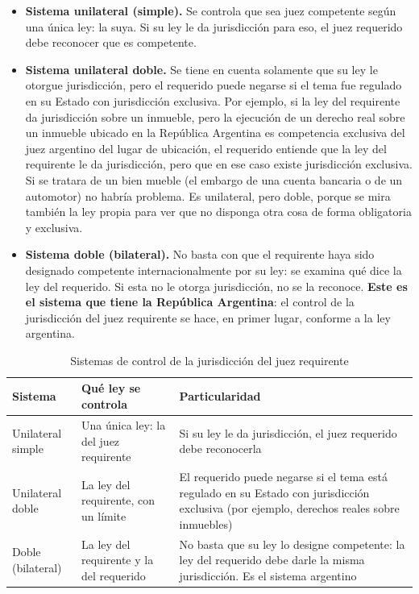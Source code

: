 \documentclass[12pt,oneside]{book}
\begin{document}
\begin{itemize}
    \item \textbf{Sistema unilateral (simple).} Se controla que sea juez competente según una única ley: la suya. Si su ley le da jurisdicción para eso, el juez requerido debe reconocer que es competente.
    \item \textbf{Sistema unilateral doble.} Se tiene en cuenta solamente que su ley le otorgue jurisdicción, pero el requerido puede negarse si el tema fue regulado en su Estado con jurisdicción exclusiva. Por ejemplo, si la ley del requirente da jurisdicción sobre un inmueble, pero la ejecución de un derecho real sobre un inmueble ubicado en la República Argentina es competencia exclusiva del juez argentino del lugar de ubicación, el requerido entiende que la ley del requirente le da jurisdicción, pero que en ese caso existe jurisdicción exclusiva. Si se tratara de un bien mueble (el embargo de una cuenta bancaria o de un automotor) no habría problema. Es unilateral, pero doble, porque se mira también la ley propia para ver que no disponga otra cosa de forma obligatoria y exclusiva.
    \item \textbf{Sistema doble (bilateral).} No basta con que el requirente haya sido designado competente internacionalmente por su ley: se examina qué dice la ley del requerido. Si esta no le otorga jurisdicción, no se la reconoce. \textbf{Este es el sistema que tiene la República Argentina}: el control de la jurisdicción del juez requirente se hace, en primer lugar, conforme a la ley argentina.
\end{itemize}


\begin{table}[H]
\centering
\caption{Sistemas de control de la jurisdicción del juez requirente}
\small
\begin{tabularx}{\textwidth}{>{\raggedright\arraybackslash}p{}YY}
\toprule
\textbf{Sistema} & \textbf{Qué ley se controla} & \textbf{Particularidad} \\
\midrule
Unilateral simple & Una única ley: la del juez requirente & Si su ley le da jurisdicción, el juez requerido debe reconocerla \\
Unilateral doble & La ley del requirente, con un límite & El requerido puede negarse si el tema está regulado en su Estado con jurisdicción exclusiva (por ejemplo, derechos reales sobre inmuebles) \\
Doble (bilateral) & La ley del requirente y la del requerido & No basta que su ley lo designe competente: la ley del requerido debe darle la misma jurisdicción. Es el sistema argentino \\
\bottomrule
\end{tabularx}
\end{table}
\end{document}
